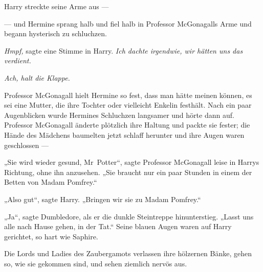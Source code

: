 Harry streckte seine Arme aus —

— und Hermine sprang halb und fiel halb in Professor McGonagalls Arme und begann hysterisch zu schluchzen.

\emph{Hmpf,} sagte eine Stimme in Harry. \emph{Ich dachte irgendwie, wir hätten uns das verdient.}

\emph{Ach, halt die Klappe.}

Professor McGonagall hielt Hermine so fest, dass man hätte meinen können, es sei eine Mutter, die ihre Tochter oder vielleicht Enkelin festhält. Nach ein paar Augenblicken wurde Hermines Schluchzen langsamer und hörte dann auf. Professor McGonagall änderte plötzlich ihre Haltung und packte sie fester; die Hände des Mädchens baumelten jetzt schlaff herunter und ihre Augen waren geschlossen —

„Sie wird wieder gesund, Mr~Potter“, sagte Professor McGonagall leise in Harrys Richtung, ohne ihn anzusehen.
„Sie braucht nur ein paar Stunden in einem der Betten von Madam Pomfrey.“

„Also gut“, sagte Harry.
„Bringen wir sie zu Madam Pomfrey.“

„Ja“, sagte Dumbledore, als er die dunkle Steintreppe hinunterstieg.
„Lasst uns alle nach Hause gehen, in der Tat.“
Seine blauen Augen waren auf Harry gerichtet, so hart wie Saphire.

\later

Die Lords und Ladies des Zaubergamots verlassen ihre hölzernen Bänke, gehen so, wie sie gekommen sind, und sehen ziemlich nervös aus.

